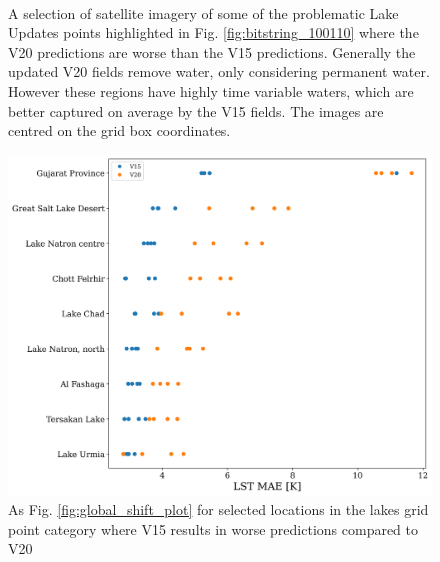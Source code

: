 \documentclass[hess, twostagejnl]{copernicus}
\begin{document}
\begin{figure}
	 \hspace{1mm}
	 \hspace{1mm} \\
	\caption{A selection of satellite imagery of some of the problematic Lake Updates points highlighted in Fig. \ref{fig:bitstring_100110} where the V20 predictions are worse than the V15 predictions. Generally the updated V20 fields remove water, only considering permanent water. However these regions have highly time variable waters, which are better captured on average by the V15 fields. The images are centred on the grid box coordinates.} 
	\label{fig:example_test}
\end{figure}


\begin{figure}
	\includegraphics[width=\columnwidth]{selected_points_shift_plot_new}
	\caption{As Fig. \ref{fig:global_shift_plot} for selected locations in the lakes grid point category where V15 results in worse predictions compared to V20} 
	\label{fig:lake_sub_categories}
\end{figure}
\end{document}
